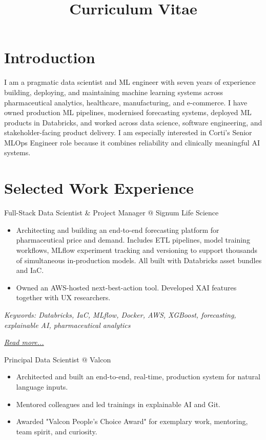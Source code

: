 \documentclass[11pt,a4paper]{moderncv}
\title{Curriculum Vitae}
\begin{document}
\makecvtitle

\section*{Introduction}
I am a pragmatic data scientist and ML engineer with seven years of experience building, deploying, and maintaining machine learning systems across pharmaceutical analytics, healthcare, manufacturing, and e-commerce. I have owned production ML pipelines, modernised forecasting systems, deployed ML products in Databricks, and worked across data science, software engineering, and stakeholder-facing product delivery. I am especially interested in Corti's Senior MLOps Engineer role because it combines reliability and clinically meaningful AI systems.

\section{Selected Work Experience}

\large{Full-Stack Data Scientist \& Project Manager @ Signum Life Science}
\normalsize
\begin{itemize}
    \item Architecting and building an end-to-end forecasting platform for pharmaceutical price and demand. Includes ETL pipelines, model training workflows, MLflow experiment tracking and versioning to support thousands of simultaneous in-production models. All built with Databricks asset bundles and IaC.
    \item Owned an AWS-hosted next-best-action tool. Developed XAI features together with UX researchers.
\end{itemize}

{\footnotesize\textit{Keywords: Databricks, IaC, MLflow, Docker, AWS, XGBoost, forecasting, explainable AI, pharmaceutical analytics}}

\hfill{\small{\textit{\hyperref[sec:signum]{Read more...}}}}

\large{Principal Data Scientist @ Valcon}
\normalsize
\begin{itemize}
    \item Architected and built an end-to-end, real-time, production system for natural language inputs.
    \item Mentored colleagues and led trainings in explainable AI and Git.
    \item Awarded "Valcon People's Choice Award" for exemplary work, mentoring, team spirit, and curiosity.
\end{itemize}
\end{document}

